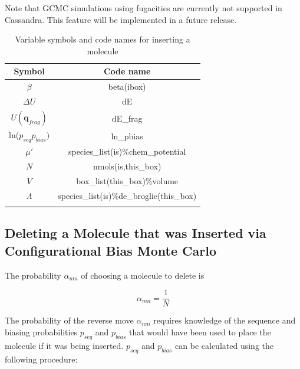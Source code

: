 Note that GCMC simulations using fugacities are currently not supported in Cassandra. This feature
will be implemented in a future release.

\begin{table}
\caption{Variable symbols and code names for inserting a molecule}
\label{table:cbmcInsert}
\centering
\begin{tabular}{|c|c|} \hline
 {\bf Symbol} & {\bf Code name} \\ \hline
 $\beta$ & beta(ibox) \\
 $\Delta U$ & dE \\
 $U(\mathbf{q}_{frag})$ & dE\_frag \\
 ln($p_{seq}p_{bias})$ & ln\_pbias \\
 $\mu'$ & species\_list(is)\%chem\_potential \\
 $N$ & nmols(is,this\_box) \\
 $V$ & box\_list(this\_box)\%volume \\
 $\Lambda$ & species\_list(is)\%de\_broglie(this\_box) \\
 \hline
\multicolumn{2}{c}{}
\end{tabular}
\end{table}

\subsection{Deleting a Molecule that was Inserted via \newline Configurational Bias Monte Carlo}
\label{sec:cbmcDelete}

The probability $\alpha_{mn}$ of choosing a molecule to delete is

\begin{equation}
\alpha_{mn} = \frac{1}{N}
\end{equation}

The probability of the reverse move $\alpha_{nm}$ requires knowledge of the sequence and biasing probabilities $p_{seq}$ and $p_{bias}$ that would have been used to place the molecule if it was being inserted. $p_{seq}$ and $p_{bias}$ can be calculated using the following procedure:

